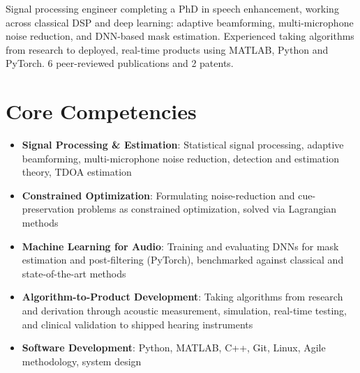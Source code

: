 \documentclass[11pt,a4paper,sans]{moderncv}
\begin{document}
\makecvtitle


\vspace{6pt}
\small{Signal processing engineer completing a PhD in speech enhancement, working across classical DSP and deep learning: adaptive beamforming, multi-microphone noise reduction, and DNN-based mask estimation. Experienced taking algorithms from research to deployed, real-time products using MATLAB, Python and PyTorch. 6 peer-reviewed publications and 2 patents.}


\section{Core Competencies}
\vspace{1pt}
\begin{itemize}

\item \textbf{Signal Processing \& Estimation}: Statistical signal processing, adaptive beamforming, multi-microphone noise reduction, detection and estimation theory, TDOA estimation

\item \textbf{Constrained Optimization}: Formulating noise-reduction and cue-preservation problems as constrained optimization, solved via Lagrangian methods

\item \textbf{Machine Learning for Audio}: Training and evaluating DNNs for mask estimation and post-filtering (PyTorch), benchmarked against classical and state-of-the-art methods

\item \textbf{Algorithm-to-Product Development}: Taking algorithms from research and derivation through acoustic measurement, simulation, real-time testing, and clinical validation to shipped hearing instruments

\item \textbf{Software Development}: Python, MATLAB, C++, Git, Linux, Agile methodology, system design

\end{itemize}

\end{document}
